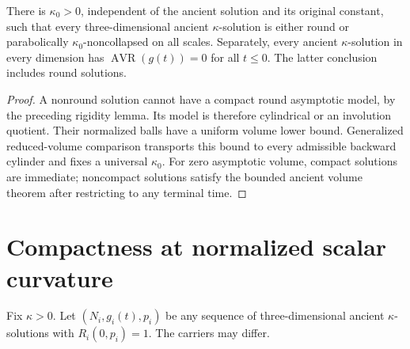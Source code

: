\begin{theorem}
\label{thm:ancient-universal}
There is $\kappa_0>0$, independent of the ancient solution and its
original constant, such that every three-dimensional ancient
$\kappa$-solution is either round or parabolically
$\kappa_0$-noncollapsed on all scales.
Separately, every ancient $\kappa$-solution in every dimension
has $\operatorname{AVR}(g(t))=0$ for all $t\leq0$.
The latter conclusion includes round solutions.
\end{theorem}
\begin{proof}
A nonround solution cannot have a compact round asymptotic model, by the
preceding rigidity lemma. Its model is therefore cylindrical or an involution
quotient. Their normalized balls have a uniform volume lower bound.
Generalized reduced-volume comparison transports this bound to every
admissible backward cylinder and fixes a universal $\kappa_0$. For zero
asymptotic volume, compact solutions are immediate; noncompact solutions
satisfy the bounded ancient volume theorem after restricting to any terminal
time.
\end{proof}

\section{Compactness at normalized scalar curvature}

Fix $\kappa>0$.  Let $(N_i,g_i(t),p_i)$ be any sequence of
three-dimensional ancient $\kappa$-solutions with $R_i(0,p_i)=1$.
The carriers may differ.

